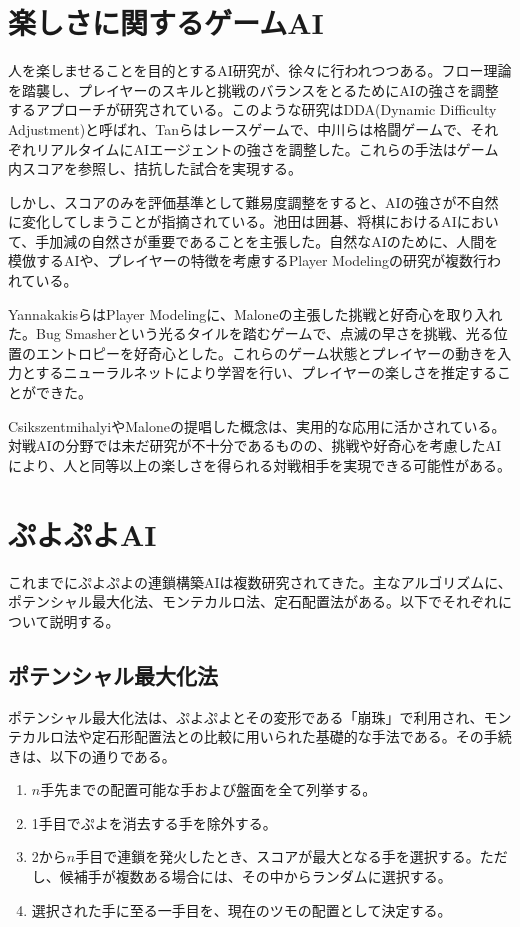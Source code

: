 \documentclass[12pt]{jarticle}
\begin{document}
\section{楽しさに関するゲームAI}
人を楽しませることを目的とするAI研究が、徐々に行われつつある。フロー理論を踏襲し、プレイヤーのスキルと挑戦のバランスをとるためにAIの強さを調整するアプローチが研究されている。このような研究はDDA(Dynamic Difficulty Adjustment)と呼ばれ、Tanら\cite{DDA_race}はレースゲームで、中川ら\cite{DDA_fight}は格闘ゲームで、それぞれリアルタイムにAIエージェントの強さを調整した。これらの手法はゲーム内スコアを参照し、拮抗した試合を実現する。

しかし、スコアのみを評価基準として難易度調整をすると、AIの強さが不自然に変化してしまうことが指摘されている。池田\cite{ikeda}は囲碁、将棋におけるAIにおいて、手加減の自然さが重要であることを主張した。自然なAIのために、人間を模倣するAIや、プレイヤーの特徴を考慮するPlayer Modelingの研究が複数行われている\cite{yan_panorama, adaptive}。

Yannakakisら\cite{yan_adaptive}はPlayer Modelingに、Maloneの主張した挑戦と好奇心を取り入れた。Bug Smasherという光るタイルを踏むゲームで、点滅の早さを挑戦、光る位置のエントロピーを好奇心とした。これらのゲーム状態とプレイヤーの動きを入力とするニューラルネットにより学習を行い、プレイヤーの楽しさを推定することができた。

CsikszentmihalyiやMaloneの提唱した概念は、実用的な応用に活かされている。対戦AIの分野では未だ研究が不十分であるものの、挑戦や好奇心を考慮したAIにより、人と同等以上の楽しさを得られる対戦相手を実現できる可能性がある。

\section{ぷよぷよAI}
これまでにぷよぷよの連鎖構築AIは複数研究されてきた。主なアルゴリズムに、ポテンシャル最大化法、モンテカルロ法、定石配置法がある。以下でそれぞれについて説明する。

\subsection{ポテンシャル最大化法}
ポテンシャル最大化法は、ぷよぷよとその変形である「崩珠」で利用され、モンテカルロ法や定石形配置法との比較に用いられた基礎的な手法である\cite{puyo_monte, puyo_temp}。その手続きは、以下の通りである。
\begin{enumerate}
\item $n$手先までの配置可能な手および盤面を全て列挙する。
\item 1手目でぷよを消去する手を除外する。
\item 2から$n$手目で連鎖を発火したとき、スコアが最大となる手を選択する。ただし、候補手が複数ある場合には、その中からランダムに選択する。
\item 選択された手に至る一手目を、現在のツモの配置として決定する。
\end{enumerate}
\end{document}
